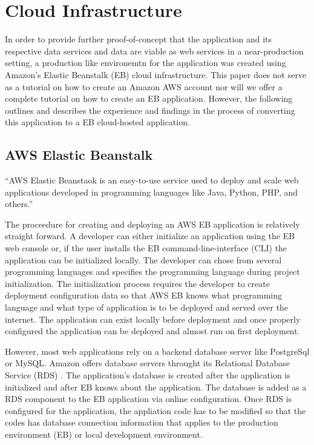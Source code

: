 \section{Cloud Infrastructure}
In order to provide further proof-of-concept that the application and its 
respective data services and data are viable as web services in a 
near-production setting, a production like environemtn for the application 
was created using Amazon's Elastic Beanstalk (EB) cloud infrastructure.  This 
paper does not serve as a tutorial on how to create an Amazon AWS account nor 
will we offer a complete tutorial on how to create an EB application.  
However, the following outlines and describes the experience and findings in 
the process of converting this application to a EB cloud-hosted application.

\subsection{AWS Elastic Beanstalk}
``AWS Elastic Beanstaok is an easy-to-use service used to deploy and scale web 
applications developed in programming languages like Java, Python, PHP, and 
others.''\cite{AWSEB2018}

The proceedure for creating and deploying an AWS EB application is relatively 
straight forward.  A developer can either initialize an application using the 
EB web console or, if the user installs the EB command-line-interface (CLI) 
the application can be initialized locally.  The developer can chose from 
several programming languages and specifies the programming language during 
project initialization.  The initialization process requires the developer to 
create deployment configuration data so that AWS EB knows what programming 
language and what type of application is to be deployed and served over the 
internet.  The application can exist locally before deployment and once properly 
configured the application can be deployed and almost run on first deployment.  

However, most web applications rely on a backend database server like 
PostgreSql or MySQL.  Amazon offers database servers throught its 
Relational Database Service (RDS) \cite{RDS2018}.  The application's 
database is created after the application is initialized and after EB knows 
about the application.  The database is added as a RDS component to the EB 
application via online configuration.  Once RDS is configured for the 
application, the appliation code has to be modified so that the codes has 
database connection information that applies to the production environment 
(EB) or local development environment.

